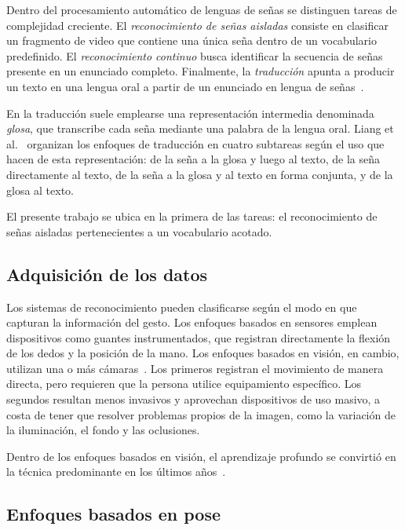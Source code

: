 Dentro del procesamiento automático de lenguas de señas se distinguen tareas de complejidad creciente. El \emph{reconocimiento de señas aisladas} consiste en clasificar un fragmento de video que contiene una única seña dentro de un vocabulario predefinido. El \emph{reconocimiento continuo} busca identificar la secuencia de señas presente en un enunciado completo. Finalmente, la \emph{traducción} apunta a producir un texto en una lengua oral a partir de un enunciado en lengua de señas~\cite{ronchetti2016lsa64, liang2023survey}.

En la traducción suele emplearse una representación intermedia denominada \emph{glosa}, que transcribe cada seña mediante una palabra de la lengua oral. Liang et al.~\cite{liang2023survey} organizan los enfoques de traducción en cuatro subtareas según el uso que hacen de esta representación: de la seña a la glosa y luego al texto, de la seña directamente al texto, de la seña a la glosa y al texto en forma conjunta, y de la glosa al texto.

El presente trabajo se ubica en la primera de las tareas: el reconocimiento de señas aisladas pertenecientes a un vocabulario acotado.

\subsection{Adquisición de los datos}

Los sistemas de reconocimiento pueden clasificarse según el modo en que capturan la información del gesto. Los enfoques basados en sensores emplean dispositivos como guantes instrumentados, que registran directamente la flexión de los dedos y la posición de la mano. Los enfoques basados en visión, en cambio, utilizan una o más cámaras~\cite{cheok2019review}. Los primeros registran el movimiento de manera directa, pero requieren que la persona utilice equipamiento específico. Los segundos resultan menos invasivos y aprovechan dispositivos de uso masivo, a costa de tener que resolver problemas propios de la imagen, como la variación de la iluminación, el fondo y las oclusiones.

Dentro de los enfoques basados en visión, el aprendizaje profundo se convirtió en la técnica predominante en los últimos años~\cite{rastgoo2021survey}.

\subsection{Enfoques basados en pose}

